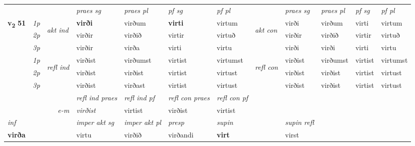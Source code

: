 \begin{longtable}[l]{X>{\footnotesize\itshape}llXXXXlXXXX}
 & &   & \textit{praes sg}  & \textit{praes pl}    & \textit{ pf sg} & \textit{pf pl} & & \textit{praes sg}  & \textit{praes pl}    & \textit{pf sg} & \textit{pf pl }  \\ \cmidrule{4-7} \cmidrule{9-12}
 \multirow{2}{*}{{{\textbf{v{\textsubscript{2}}} \Large{\textbf{51}}}}}  & 1p & \multirow{3}{*}{\begin{turn}{90}\textit{akt ind}\end{turn}} & \textbf{virði} & virðum & \textbf{virti} & virtum & \multirow{3}{*}{\begin{turn}{90}\textit{akt con}\end{turn}} &virði & virðum & virti & virtum\\*
 & 2p &  &  virðir  & virðið & virtir & virtuð & & virðir & virðið & virtir & virtuð \\*
 & 3p &  & virðir & virða & virti & virtu & & virði & virði& virti & virtu \\*
\cmidrule{4-7} \cmidrule{9-12}
 & 1p & \multirow{3}{*}{\begin{turn}{90}\textit{refl ind}\end{turn}}  & virðist & virðumst & virtist & virtumst & \multirow{3}{*}{\begin{turn}{90}\textit{refl con}\end{turn}}  &virðist & virðumst & virtist & virtumst \\*
 & 2p &  & virðist & virðist & virtist & virtust & &virðist & virðist & virtist & virtust \\*
 & 3p  & & virðist & virðast & virtist & virtust & & virðist & virðist& virtist & virtust \\*
\cmidrule{4-7} \cmidrule{9-12}

 & && \textit{refl ind praes} & \textit{refl ind pf} & \textit{refl con praes} & \textit{refl con pf} \\*
\multicolumn{3}{r}{\textit{e-m}}& virðist & virtist & virðist & virtist \\*

\cmidrule{4-7}
   {\textit{inf}} & &  & \textit{imper akt sg} & \textit{imper akt pl}   & \textit{presp} & \textit{supin} && \textit{supin refl}  \\*
  {\textbf{virða}} & && virtu  & virðið   & virðandi &  \textbf{virt} && virst  \\*

\midrule


\end{longtable}
